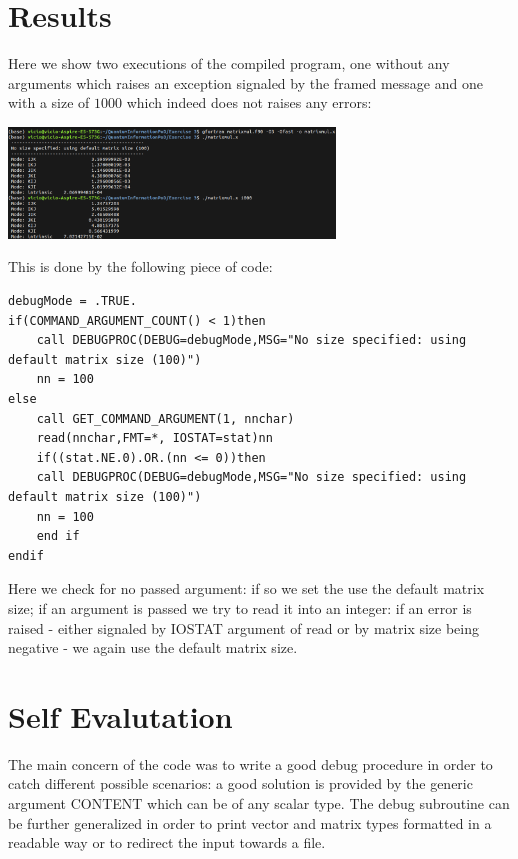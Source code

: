 \documentclass{article}
\begin{document}
\section*{Results}
Here we show two executions of the compiled program, one without any arguments which raises an exception signaled by the framed message and one with a size of $1000$ which indeed does not raises any errors:
\begin{center}
	\includegraphics[width=0.65\textwidth]{Ex3.png}
\end{center}
This is done by the following piece of code:
\begin{small}
\begin{lstlisting}
debugMode = .TRUE.
if(COMMAND_ARGUMENT_COUNT() < 1)then
	call DEBUGPROC(DEBUG=debugMode,MSG="No size specified: using default matrix size (100)")
	nn = 100
else
	call GET_COMMAND_ARGUMENT(1, nnchar)
	read(nnchar,FMT=*, IOSTAT=stat)nn
	if((stat.NE.0).OR.(nn <= 0))then
	call DEBUGPROC(DEBUG=debugMode,MSG="No size specified: using default matrix size (100)")
	nn = 100
	end if
endif
\end{lstlisting}
\end{small}
Here we check for no passed argument: if so we set the use the default matrix size; if an argument is passed we try to read it into an integer: if an error is raised - either signaled by IOSTAT argument of read or by matrix size being negative - we again use the default matrix size.
\section*{Self Evalutation}
The main concern of the code was to write a good debug procedure in order to catch different possible scenarios: a good solution is provided by the generic argument CONTENT which can be of any scalar type. The debug subroutine can be further generalized in order to print vector and matrix types formatted in a readable way or to redirect the input towards a file.
\end{document}

